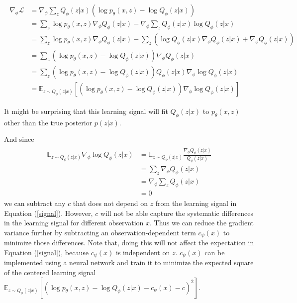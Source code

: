 \documentclass[11pt,a4paper]{article}
\begin{document}
\begin{align}
\label{signal}
    \begin{split}
        \nabla_\phi \mathcal{L} & = \nabla_\phi \sum_z  Q_\phi(z|x) ( \log p_\theta(x,z) - \log Q_\phi(z|x) ) \\
        & = \sum_z \log p_\theta(x,z) \nabla_\phi Q_\phi(z|x) - \nabla_\phi \sum_z Q_\phi(z|x) \log Q_\phi(z|x) \\
        & = \sum_z \log p_\theta(x,z) \nabla_\phi Q_\phi(z|x) - \sum_z ( \log Q_\phi(z|x) \nabla_\phi Q_\phi(z|x) + \nabla_\phi Q_\phi(z|x) ) \\
        & = \sum_z ( \log p_\theta(x,z) - \log Q_\phi(z|x) ) \nabla_\phi Q_\phi(z|x) \\
        & = \sum_z ( \log p_\theta(x,z) - \log Q_\phi(z|x) ) Q_\phi(z|x) \nabla_\phi \log Q_\phi(z|x)\\
        & = \mathbb{E}_{z \sim Q_\phi(z|x)} [(\log p_\theta(x,z) - \log Q_\phi(z|x))  \nabla_\phi \log Q_\phi(z|x)]
    \end{split}
\end{align}

It might be surprising that this learning signal will fit $Q_\phi(z|x)$ to $p_\theta(x,z)$ other than the true posterior $p(z|x)$.

And since
\begin{align}
    \begin{split}
        \mathbb{E}_{z \sim Q_\phi(z|x)} \nabla_\phi \log Q_\phi(z|x) & = \mathbb{E}_{z \sim Q_\phi(z|x)} \frac{\nabla_\phi Q_\phi(z|x)}{Q_\phi(z|x)}\\
        & = \sum_z \nabla_\phi Q_\phi(z|x) \\
        & = \nabla_\phi \sum_z  Q_\phi(z|x) \\
        & = 0 
    \end{split}
\end{align}
we can subtract any $c$ that does not depend on $z$ from the learning signal in Equation (\ref{signal}).  However, $c$ will not be able capture the systematic differences in the learning signal for different observation $x$. Thus we can reduce the gradient variance further by subtracting an observation-dependent term $c_\psi(x)$ to minimize those differences. Note that, doing this will not affect the expectation in Equation (\ref{signal}), because $c_\psi(x)$ is independent on $z$. $c_\psi(x)$ can be implemented using a neural network and train it to minimize the expected square of the centered learning signal $\mathbb{E}_{z \sim Q_\phi(z|x)} [(\log p_\theta(x,z) - \log Q_\phi(z|x) - c_\psi(x) - c)^2]$.
\end{document}
